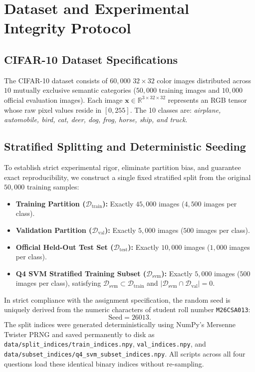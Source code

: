 \section{Dataset and Experimental Integrity Protocol}
\label{sec:dataset}

\subsection{CIFAR-10 Dataset Specifications}
The CIFAR-10 dataset consists of $60{,}000$ $32 \times 32$ color images distributed across $10$ mutually exclusive semantic categories ($50{,}000$ training images and $10{,}000$ official evaluation images). Each image $\mathbf{x} \in \mathbb{R}^{3 \times 32 \times 32}$ represents an RGB tensor whose raw pixel values reside in $[0, 255]$. The 10 classes are: \textit{airplane, automobile, bird, cat, deer, dog, frog, horse, ship, and truck}.

\subsection{Stratified Splitting and Deterministic Seeding}
To establish strict experimental rigor, eliminate partition bias, and guarantee exact reproducibility, we construct a single fixed stratified split from the original $50{,}000$ training samples:
\begin{itemize}
    \item \textbf{Training Partition ($\mathcal{D}_{\text{train}}$):} Exactly $45{,}000$ images ($4{,}500$ images per class).
    \item \textbf{Validation Partition ($\mathcal{D}_{\text{val}}$):} Exactly $5{,}000$ images ($500$ images per class).
    \item \textbf{Official Held-Out Test Set ($\mathcal{D}_{\text{test}}$):} Exactly $10{,}000$ images ($1{,}000$ images per class).
    \item \textbf{Q4 SVM Stratified Training Subset ($\mathcal{D}_{\text{svm}}$):} Exactly $5{,}000$ images ($500$ images per class), satisfying $\mathcal{D}_{\text{svm}} \subset \mathcal{D}_{\text{train}}$ and $|\mathcal{D}_{\text{svm}} \cap \mathcal{D}_{\text{val}}| = 0$.
\end{itemize}

In strict compliance with the assignment specification, the random seed is uniquely derived from the numeric characters of student roll number \texttt{M26CSA013}:
\begin{equation}
    \text{Seed} = 26013.
\end{equation}
The split indices were generated deterministically using NumPy's Mersenne Twister PRNG and saved permanently to disk as \texttt{data/split\_indices/train\_indices.npy}, \texttt{val\_indices.npy}, and \texttt{data/subset\_indices/q4\_svm\_subset\_indices.npy}. All scripts across all four questions load these identical binary indices without re-sampling.

